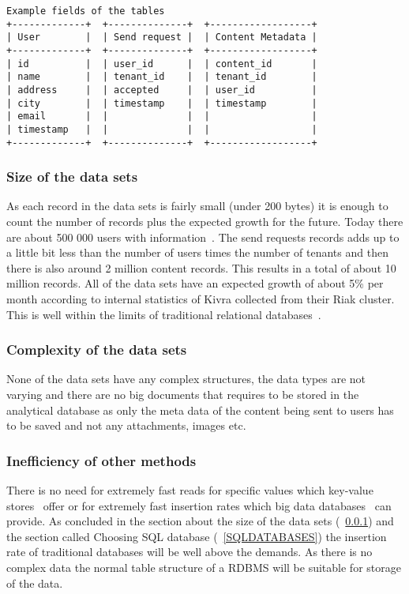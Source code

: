 \documentclass[a4paper,12pt]{article}
\begin{document}
\begin{lstlisting}[label=example_tables,caption=Example tables]
Example fields of the tables
+-------------+  +--------------+  +------------------+
| User        |  | Send request |  | Content Metadata |
+-------------+  +--------------+  +------------------+
| id          |  | user_id      |  | content_id       |
| name        |  | tenant_id    |  | tenant_id        |
| address     |  | accepted     |  | user_id          |
| city        |  | timestamp    |  | timestamp        |
| email       |  |              |  |                  |
| timestamp   |  |              |  |                  |
+-------------+  +--------------+  +------------------+
\end{lstlisting}

\subsubsection{Size of the data sets}
\label{DATASETSIZE}
As each record in the data sets is fairly small (under 200 bytes) it is enough to count the number of records plus the expected growth for the future. Today there are about 500 000 users with information~\cite{KIVRA}. 
The send requests records adds up to a little bit less than the number of users times the number of tenants and then there is also around 2 million content records. This results in a total of about 10 million records. 
All of the data sets have an expected growth of about 5\% per month according to internal statistics of Kivra collected from their Riak cluster. This is well within the limits of traditional relational databases~\cite{SQLPERF}.

\subsubsection{Complexity of the data sets}
None of the data sets have any complex structures, the data types are not varying and there are no big documents that requires to be stored in the analytical database as only the meta data of the content being 
sent to users has to be saved and not any attachments, images etc.

\subsubsection{Inefficiency of other methods}
There is no need for extremely fast reads for specific values which key-value stores~\cite{KEYVALUESTORE} offer or for extremely fast insertion rates which big data databases~\cite{BD1} can provide. 
As concluded in the section about the size of the data sets (~\ref{DATASETSIZE}) and the section called Choosing SQL database (~\ref{SQLDATABASES}) the insertion rate of 
traditional databases will be well above the demands. As there is no complex data the normal table structure of a RDBMS will be suitable for storage of the data. 
\end{document}
